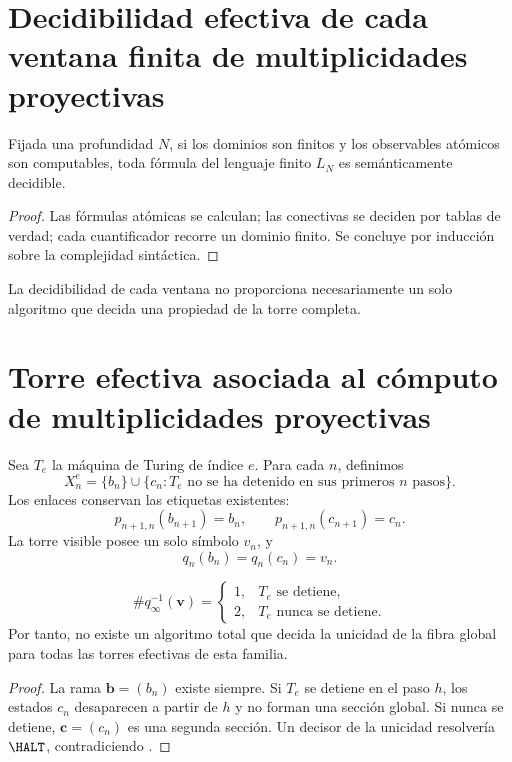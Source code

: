 \label{chap:p3-83-46-godel_turing}

\section{Decidibilidad efectiva de cada ventana finita de multiplicidades proyectivas}

\begin{proposition}
Fijada una profundidad \(N\), si los dominios son finitos y los observables
atómicos son computables, toda fórmula del lenguaje finito
\(L_N\) es semánticamente decidible.
\end{proposition}

\begin{proof}
Las fórmulas atómicas se calculan; las conectivas se deciden por tablas de
verdad; cada cuantificador recorre un dominio finito. Se concluye por
inducción sobre la complejidad sintáctica.
\end{proof}

La decidibilidad de cada ventana no proporciona necesariamente un solo
algoritmo que decida una propiedad de la torre completa.

\section{Torre efectiva asociada al cómputo de multiplicidades proyectivas}

Sea \(T_e\) la máquina de Turing de índice \(e\). Para cada \(n\), definimos
\[
 X_n^e
 =
 \{b_n\}
 \cup
 \{c_n:T_e\text{ no se ha detenido en sus primeros }n\text{ pasos}\}.
\]
Los enlaces conservan las etiquetas existentes:
\[
  p_{n+1,n}(b_{n+1})=b_n,
  \qquad
  p_{n+1,n}(c_{n+1})=c_n.
\]
La torre visible posee un solo símbolo \(v_n\), y
\[
  q_n(b_n)=q_n(c_n)=v_n.
\]

\begin{theorem}
\label{p3-83-c46-s1:thm:halt-fibre}
\[
 \#q_\infty^{-1}(\boldsymbol v)
 =
 \begin{cases}
 1,&T_e\text{ se detiene},\\
 2,&T_e\text{ nunca se detiene}.
 \end{cases}
\]
Por tanto, no existe un algoritmo total que decida la unicidad de la fibra
global para todas las torres efectivas de esta familia.
\end{theorem}

\begin{proof}
La rama \(\boldsymbol b=(b_n)\) existe siempre. Si \(T_e\) se detiene en el
paso \(h\), los estados \(c_n\) desaparecen a partir de \(h\) y no forman una
sección global. Si nunca se detiene, \(\boldsymbol c=(c_n)\) es una segunda
sección. Un decisor de la unicidad resolvería \(\HALT\), contradiciendo
\citep{turing1936}.
\end{proof}

